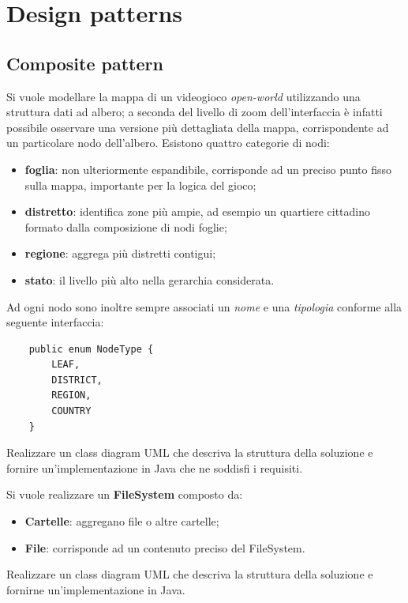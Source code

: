 \documentclass[12pt,a4paper]{article}
\begin{document}
\tableofcontents
\clearpage
	
\section{Design patterns}
    \subsection{Composite pattern}
    
    \begin{Exercise}\label{composite:ex1}
        Si vuole modellare la mappa di un videogioco \textit{open-world} utilizzando una struttura dati ad albero; a seconda del livello di zoom dell'interfaccia è infatti possibile osservare una versione più dettagliata della mappa, corrispondente ad un particolare nodo dell'albero.
        Esistono quattro categorie di nodi:
        \begin{itemize}
            \item \textbf{foglia}: non ulteriormente espandibile, corrisponde ad un preciso punto fisso sulla mappa, importante per la logica del gioco;
            \item \textbf{distretto}: identifica zone più ampie, ad esempio un quartiere cittadino formato dalla composizione di nodi foglie;
            \item \textbf{regione}: aggrega più distretti contigui;
            \item \textbf{stato}: il livello più alto nella gerarchia considerata.
        \end{itemize}
        Ad ogni nodo sono inoltre sempre associati un \textit{nome} e una \textit{tipologia} conforme alla seguente interfaccia:
        \begin{lstlisting}
    public enum NodeType {
        LEAF,
        DISTRICT,
        REGION,
        COUNTRY
    }
        \end{lstlisting}
        
        Realizzare un class diagram UML che descriva la struttura della soluzione e fornire un'implementazione in Java che ne soddisfi i requisiti.
    \end{Exercise}
    
    \begin{Exercise}\label{composite:ex2} 
    Si vuole realizzare un \textbf{FileSystem} composto da:
        \begin{itemize}
            \item \textbf{Cartelle}: aggregano file o altre cartelle;
            \item \textbf{File}: corrisponde ad un contenuto preciso del FileSystem.
        \end{itemize}
		Realizzare un class diagram UML che descriva la struttura della soluzione e 
		fornirne un'implementazione in Java.
    \end{Exercise}
    
\end{document}
